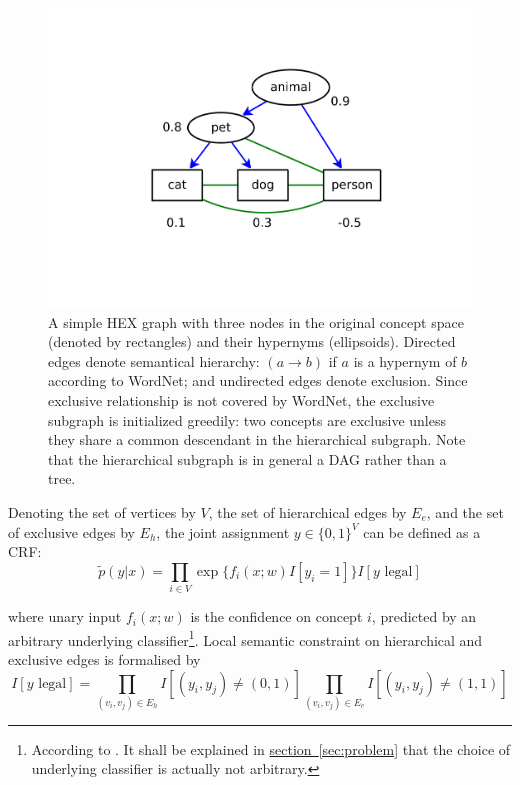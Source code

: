 \documentclass[11pt,a4paper]{article}
\begin{document}
\begin{figure}[h]
\centering
\includegraphics[scale=0.5]{naive.pdf}
\caption{A simple HEX graph with three nodes in the original concept space (denoted by rectangles) and their hypernyms (ellipsoids). Directed edges denote semantical hierarchy: $(a\rightarrow b)$ if $a$ is a hypernym of $b$ according to WordNet; and undirected edges denote exclusion. Since exclusive relationship is not covered by WordNet, the exclusive subgraph is initialized greedily: two concepts are exclusive unless they share a common descendant in the hierarchical subgraph. Note that the hierarchical subgraph is in general a DAG rather than a tree.}
\label{fig:naive}
\end{figure}

Denoting the set of vertices by $V$, the set of hierarchical edges by $E_e$, and the set of exclusive edges by $E_h$, the joint assignment $y\in\{0,1\}^V$ can be defined as a CRF:
\begin{equation}
\tilde{p}(y|x)=\prod_{i\in V}\exp\{f_i(x;w)I[y_i=1]\}I[y\text{ legal}]
\label{eqn:naive}
\end{equation}

where unary input $f_i(x;w)$ is the confidence on concept $i$, predicted by an arbitrary underlying classifier\footnote{According to \cite{deng2014large}. It shall be explained in \hyperref[sec:problem]{section~\ref{sec:problem}} that the choice of underlying classifier is actually not arbitrary.}. Local semantic constraint on hierarchical and exclusive edges is formalised by
\begin{equation}
I[y\text{ legal}]=\prod_{(v_i,v_j)\in E_h}I[(y_i,y_j)\neq(0,1)]\prod_{(v_i,v_j)\in E_e}I[(y_i,y_j)\neq(1,1)]
\label{eqn:legal}
\end{equation}
\end{document}
